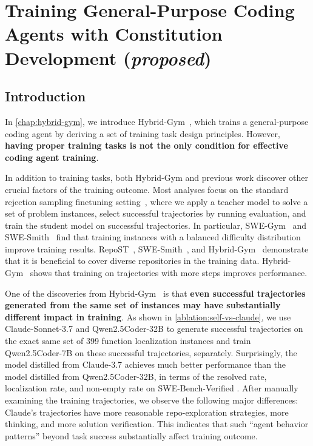 \chapter{Training General-Purpose Coding Agents with Constitution Development \textcolor{mediumgreen}{(\textit{proposed})}}
\label{chap:effective-analysis}



\section{Introduction}

In \autoref{chap:hybrid-gym}, we introduce Hybrid-Gym~\cite{hybrid-gym}, which trains a general-purpose coding agent by deriving a set of training task design principles. 
However, \textbf{having proper training tasks is not the only condition for effective coding agent training}.

In addition to training tasks, both Hybrid-Gym and previous work discover other crucial factors of the training outcome.
Most analyses focus on the standard rejection sampling finetuning setting~\cite{rejection-sampling}, where we apply a teacher model to solve a set of problem instances, select successful trajectories by running evaluation, and train the student model on successful trajectories.
In particular, SWE-Gym~\cite{swegym} and SWE-Smith~\cite{swe-smith} find that training instances with a balanced difficulty distribution improve training results.
RepoST~\cite{repost}, SWE-Smith~\cite{swe-smith}, and Hybrid-Gym~\cite{hybrid-gym} demonstrate that it is beneficial to cover diverse repositories in the training data.
Hybrid-Gym~\cite{hybrid-gym} shows that training on trajectories with more steps improves performance.

One of the discoveries from Hybrid-Gym~\cite {hybrid-gym} is that \textbf{even successful trajectories generated from the same set of instances may have substantially different impact in training}.
As shown in \autoref{ablation:self-vs-claude}, we use Claude-Sonnet-3.7 and Qwen2.5Coder-32B to generate successful trajectories on the exact same set of 399 function localization instances and train Qwen2.5Coder-7B on these successful trajectories, separately.
Surprisingly, the model distilled from Claude-3.7 achieves much better performance than the model distilled from Qwen2.5Coder-32B, in terms of the resolved rate, localization rate, and non-empty rate on SWE-Bench-Verified \cite{swebench}.
After manually examining the training trajectories, we observe the following major differences: Claude's trajectories have more reasonable repo-exploration strategies, more thinking, and more solution verification. This indicates that such ``agent behavior patterns'' beyond task success substantially affect training outcome.

